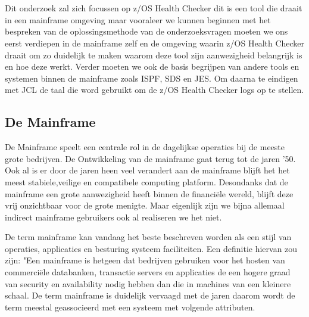 \chapter{}
\label{ch:stand-van-zaken}



Dit onderzoek zal zich focussen op z/OS Health Checker dit is een tool die draait in een mainframe omgeving maar vooraleer we kunnen beginnen met het bespreken van de oplossingsmethode van de onderzoeksvragen moeten we ons eerst verdiepen in de mainframe zelf en de omgeving waarin z/OS Health Checker draait om zo duidelijk te maken waarom deze tool zijn aanwezigheid belangrijk is en hoe deze werkt. Verder moeten we ook de basis begrijpen van andere tools en systemen binnen de mainframe zoals ISPF, SDS en JES. Om daarna te eindigen met JCL de taal die word gebruikt om de z/OS Health Checker logs op te stellen.

\section{De Mainframe}
\label{sec:De Mainframe}

De Mainframe speelt een centrale rol in de dagelijkse operaties bij de meeste grote bedrijven. De Ontwikkeling van de mainframe gaat terug tot de jaren '50. Ook al is er door de jaren heen veel verandert aan de mainframe blijft het het meest stabiele,veilige en compatibele computing platform. Desondanks dat de mainframe een grote aanwezigheid heeft binnen de financiële wereld, blijft deze vrij onzichtbaar voor de grote menigte. Maar eigenlijk zijn we bijna allemaal indirect mainframe gebruikers ook al realiseren we het niet. \cite{Ebbers2011}

De term mainframe kan vandaag het beste beschreven worden als een stijl van operaties, applicaties en besturing systeem faciliteiten. Een definitie hiervan zou zijn: "Een mainframe is hetgeen dat bedrijven gebruiken voor het hosten van commerciële databanken, transactie servers en applicaties de een hogere graad van security en availability nodig hebben dan die in machines van een kleinere schaal. 
De term mainframe is duidelijk vervaagd met de jaren daarom wordt de term meestal geassocieerd met een systeem met volgende attributen. \cite{Ebbers2011}

